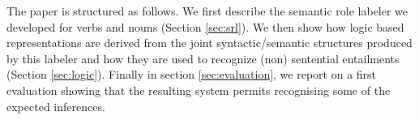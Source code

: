 \documentclass[twocolumn,10pt]{article}
\newcommand{\todo}[1]{{\color{red} \bf ** #1 **}}
\newcommand{\totranslate}[1]{{\color{gris25} #1}}
\begin{document}
The paper is structured as follows. We first describe the semantic
role labeler we developed for verbs and nouns (Section
\ref{sec:srl}). We then show how logic based representations are
derived from the joint syntactic/semantic structures produced by this
labeler and how they are used to recognize (non) sentential
entailments (Section \ref{sec:logic}). Finally in section
\ref{sec:evaluation}, we report on a first evaluation showing that the
resulting system permits recognising some of the expected
inferences. %
\end{document}
